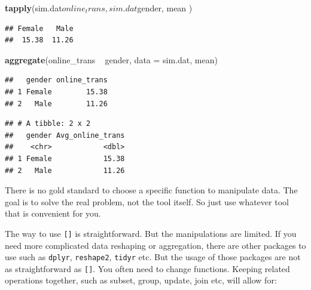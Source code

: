 \documentclass[12pt,]{krantz}
\newenvironment{Shaded}{\begin{snugshade}}{\end{snugshade}}
\newcommand{\KeywordTok}[1]{\textcolor[rgb]{0.13,0.29,0.53}{\textbf{{#1}}}}
\newcommand{\DataTypeTok}[1]{\textcolor[rgb]{0.13,0.29,0.53}{{#1}}}
\newcommand{\StringTok}[1]{\textcolor[rgb]{0.31,0.60,0.02}{{#1}}}
\newcommand{\NormalTok}[1]{{#1}}
\theoremstyle{definition}
\theoremstyle{definition}
\theoremstyle{remark}
\begin{document}
\begin{Shaded}
\begin{Highlighting}[]
\KeywordTok{tapply}\NormalTok{(sim.dat$online_trans, sim.dat$gender, mean )}
\end{Highlighting}
\end{Shaded}

\begin{verbatim}
## Female   Male 
##  15.38  11.26
\end{verbatim}

\begin{Shaded}
\begin{Highlighting}[]
\KeywordTok{aggregate}\NormalTok{(online_trans ~}\StringTok{ }\NormalTok{gender, }\DataTypeTok{data =} \NormalTok{sim.dat, mean)}
\end{Highlighting}
\end{Shaded}

\begin{verbatim}
##   gender online_trans
## 1 Female        15.38
## 2   Male        11.26
\end{verbatim}

\begin{Shaded}
\end{Shaded}

\begin{verbatim}
## # A tibble: 2 x 2
##   gender Avg_online_trans
##    <chr>            <dbl>
## 1 Female            15.38
## 2   Male            11.26
\end{verbatim}

There is no gold standard to choose a specific function to manipulate
data. The goal is to solve the real problem, not the tool itself. So
just use whatever tool that is convenient for you.

The way to use \texttt{{[}{]}} is straightforward. But the manipulations
are limited. If you need more complicated data reshaping or aggregation,
there are other packages to use such as \texttt{dplyr},
\texttt{reshape2}, \texttt{tidyr} etc. But the usage of those packages
are not as straightforward as \texttt{{[}{]}}. You often need to change
functions. Keeping related operations together, such as subset, group,
update, join etc, will allow for:
\end{document}
